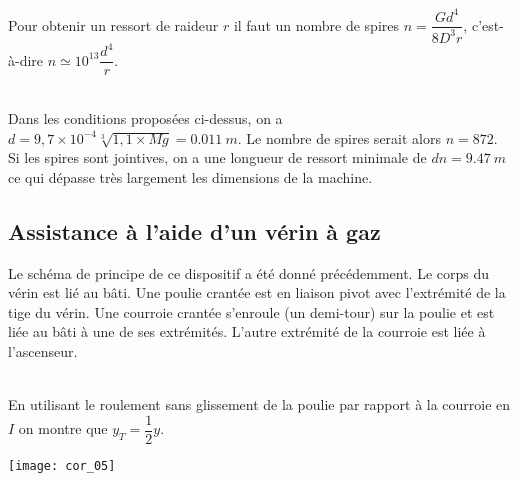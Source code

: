 Pour obtenir un ressort de raideur $r$ il faut un nombre de spires $n=\dfrac{Gd^4}{8D^3 r}$, c'est-à-dire $n\simeq 10^{13}\dfrac{d^4}{r}$.

\fi
{}
\ifprof
\begin{corrige}~\\
Dans les conditions proposées ci-dessus, on a $d=9,7 \times 10^{-4}\sqrt[3]{1,1\times Mg}= \SI{0,011}{m}$. 
Le nombre de spires serait alors $n=872$. Si les spires sont jointives, on a une longueur de ressort minimale de $dn =\SI{9,47}{m}$ ce qui dépasse très largement les dimensions de la machine.  
\end{corrige}
\else
\fi

\subsection*{Assistance à l’aide d’un vérin à gaz}
\ifprof
\else
Le schéma de principe de ce dispositif a été donné précédemment. Le corps du vérin est lié au bâti. Une poulie crantée
est en liaison pivot avec l’extrémité de la tige du vérin. Une courroie crantée s’enroule (un demi-tour) sur la poulie et est liée au bâti à une de ses extrémités. L’autre extrémité de la courroie est liée à l’ascenseur.
\fi

\ifprof
\begin{corrige}~\\

En utilisant le roulement sans glissement de la poulie par rapport à la courroie en $I$ on montre que $y_T = \dfrac{1}{2}y$.
\begin{center}
\texttt{[image: cor\_05]}
\end{center}
\end{corrige}
\else
\fi



